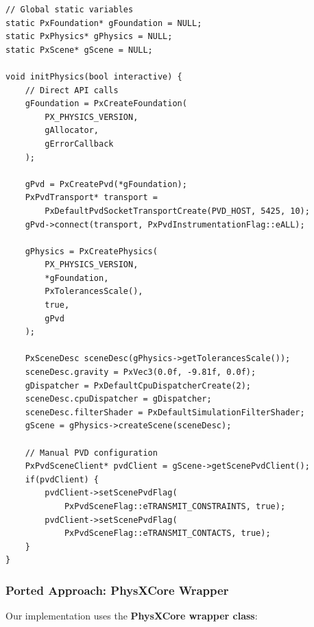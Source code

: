 \begin{lstlisting}[caption={Original: Direct PhysX API initialization}]
// Global static variables
static PxFoundation* gFoundation = NULL;
static PxPhysics* gPhysics = NULL;
static PxScene* gScene = NULL;

void initPhysics(bool interactive) {
    // Direct API calls
    gFoundation = PxCreateFoundation(
        PX_PHYSICS_VERSION,
        gAllocator,
        gErrorCallback
    );

    gPvd = PxCreatePvd(*gFoundation);
    PxPvdTransport* transport =
        PxDefaultPvdSocketTransportCreate(PVD_HOST, 5425, 10);
    gPvd->connect(transport, PxPvdInstrumentationFlag::eALL);

    gPhysics = PxCreatePhysics(
        PX_PHYSICS_VERSION,
        *gFoundation,
        PxTolerancesScale(),
        true,
        gPvd
    );

    PxSceneDesc sceneDesc(gPhysics->getTolerancesScale());
    sceneDesc.gravity = PxVec3(0.0f, -9.81f, 0.0f);
    gDispatcher = PxDefaultCpuDispatcherCreate(2);
    sceneDesc.cpuDispatcher = gDispatcher;
    sceneDesc.filterShader = PxDefaultSimulationFilterShader;
    gScene = gPhysics->createScene(sceneDesc);

    // Manual PVD configuration
    PxPvdSceneClient* pvdClient = gScene->getScenePvdClient();
    if(pvdClient) {
        pvdClient->setScenePvdFlag(
            PxPvdSceneFlag::eTRANSMIT_CONSTRAINTS, true);
        pvdClient->setScenePvdFlag(
            PxPvdSceneFlag::eTRANSMIT_CONTACTS, true);
    }
}
\end{lstlisting}

\subsubsection{Ported Approach: PhysXCore Wrapper}
Our implementation uses the \textbf{PhysXCore wrapper class}:

